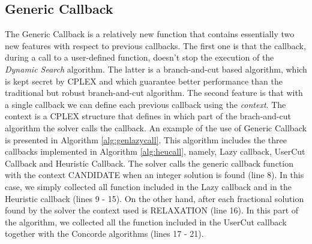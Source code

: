 \subsection{Generic Callback}
The Generic Callback is a relatively new function that contains essentially two new features with respect to previous callbacks.
The first one is that the callback, during a call to a user-defined function, doesn't stop the execution of the \textit{Dynamic Search} algorithm. The latter is a branch-and-cut based algorithm, which is kept secret by CPLEX and which guarantee better performance than the traditional but robust branch-and-cut algorithm.
The second feature is that with a single callback we can define each previous callback using the \textit{context}. The context is a CPLEX structure that defines in which part of the brach-and-cut algorithm the solver calls the callback.
An example of the use of Generic Callback is presented in Algorithm \ref{alg:genlazycall}.  This algorithm includes the three callbacks implemented in Algorithm \ref{alg:heucall}, namely, Lazy callback, UserCut Callback and Heuristic Callback. 
The solver calls the generic callback function with the context CANDIDATE when an integer solution is found (line 8). In this case, we simply collected all function included in the Lazy callback and in the Heuristic callback (lines 9 - 15). On the other hand, after each fractional solution found by the solver the context used is RELAXATION (line 16). In this part of the algorithm, we collected all the function included in the UserCut callback together with the Concorde algorithms (lines 17 - 21).

